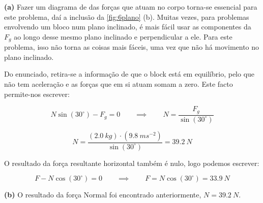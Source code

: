 \textbf{(a)} Fazer um diagrama de das forças que atuam no corpo torna-se essencial para este problema, daí a inclusão da \ref{fig:6plano} (b). Muitas vezes, para problemas envolvendo um bloco num plano inclinado, é mais fácil usar as componentes da $F_g$ ao longo desse mesmo plano inclinado e perpendicular a ele. Para este problema, isso não torna as coisas mais fáceis, uma vez que não há movimento no plano inclinado.

Do enunciado, retira-se a informação de que o block está em equilíbrio, pelo que não tem aceleração e as forças que em si atuam somam a zero. Este facto permite-nos escrever:

$$
N\sin(30^{\circ})-F_g=0 \qquad \implies \qquad N=\frac{F_g}{\sin(30^{\circ})}
$$

$$
N=\frac{(2.0\ kg)\cdot(9.8\ ms^{-2})}{\sin(30^{\circ})}=39.2\ N
$$

O resultado da força resultante horizontal também é nulo, logo podemos escrever:

$$
F-N\cos(30^{\circ})=0 \qquad \implies \qquad F=N\cos(30^{\circ})=33.9\ N
$$

\textbf{(b)} O resultado da força Normal foi encontrado anteriormente, $N=39.2\ N$.